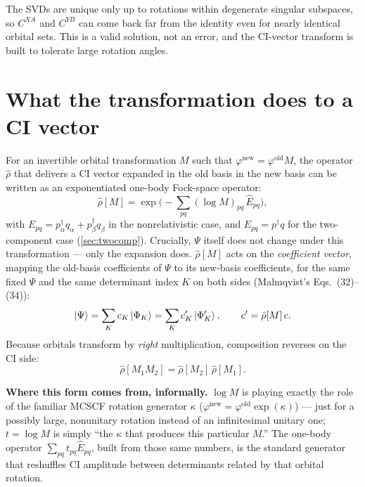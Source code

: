 \documentclass[aip,jcp,preprint]{revtex4-1}
\begin{document}
The SVDs are unique only up to rotations within degenerate singular subspaces,
so $C^{XA}$ and $C^{YB}$ can come back far from the identity even for nearly
identical orbital sets. This is a valid solution, not an error, and the
CI-vector transform is built to tolerate large rotation angles.

\section{What the transformation does to a CI vector}
\label{sec:ci}

For an invertible orbital transformation $M$ such that
$\varphi^\mathrm{new}=\varphi^\mathrm{old} M$, the operator $\hat{\rho}$ that delivers
a CI vector expanded in the old basis in the new basis can be written as an
exponentiated one-body Fock-space operator:\cite{MoshinskySeligman1971}
\begin{equation}
 \hat{\rho}[M] = \exp\!\Big(-\sum_{pq}(\log M)_{pq}\,\hat{E}_{pq}\Big),
 \label{eq:rho-def}
\end{equation}
with $E_{pq}=p_\alpha^\dagger q_\alpha+p_\beta^\dagger q_\beta$
in the nonrelativistic case, and $E_{pq}=p^\dagger q$ for the two-component case
(\cref{sec:twocomp}).
Crucially, $\Psi$ itself does not change under this transformation --- only the
expansion does. $\hat{\rho}[M]$ acts on the \emph{coefficient vector}, mapping
the old-basis coefficients of $\Psi$ to its new-basis coefficients, for the
same fixed $\Psi$ and the same determinant index $K$ on both sides
(Malmqvist's Eqs.~(32)--(34)):
\begin{equation}
 \ket{\Psi} = \sum_K c_K\ket{\Phi_K} = \sum_K c'_K\ket{\Phi'_K},
 \qquad c' = \hat{\rho}[M]\,c.
\end{equation}
Because orbitals transform by \emph{right} multiplication, composition reverses on the CI side:
\begin{equation}
 \hat{\rho}[M_1M_2] = \hat{\rho}[M_2]\,\hat{\rho}[M_1].
 \label{eq:anti}
\end{equation}

\textbf{Where this form comes from, informally.} $\log M$ is playing exactly
the role of the familiar MCSCF rotation generator $\kappa$
($\varphi^\mathrm{new}=\varphi^\mathrm{old}\exp(\kappa)$) --- just for a
possibly large, nonunitary rotation instead of an infinitesimal unitary one;
$t=\log M$ is simply ``the $\kappa$ that produces this particular $M$.'' The
one-body operator $\sum_{pq}t_{pq}\hat{E}_{pq}$, built from those same
numbers, is the standard generator that reshuffles CI amplitude between
determinants related by that orbital rotation.
\end{document}
